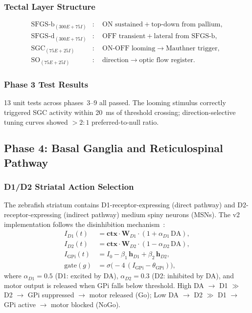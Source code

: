 \documentclass[11pt,a4paper]{article}
\begin{document}
\subsubsection{Tectal Layer Structure}

\begin{equation}\label{eq:tectal_layers}
\begin{aligned}
  \mathrm{SFGS\text{-}b}_{(300E+75I)}&: \quad \text{ON sustained} + \text{top-down from pallium}, \\
  \mathrm{SFGS\text{-}d}_{(300E+75I)}&: \quad \text{OFF transient} + \text{lateral from SFGS-b}, \\
  \mathrm{SGC}_{(75E+25I)}&:            \quad \text{ON-OFF looming} \to \text{Mauthner trigger}, \\
  \mathrm{SO}_{(75E+25I)}&:             \quad \text{direction} \to \text{optic flow register}.
\end{aligned}
\end{equation}

\subsubsection{Phase 3 Test Results}

13 unit tests across phases~3--9 all passed.
The looming stimulus correctly triggered SGC activity within 20~ms of
threshold crossing; direction-selective tuning curves showed $> 2:1$
preferred-to-null ratio.

\subsection{Phase 4: Basal Ganglia and Reticulospinal Pathway}\label{sec:phase4}

\subsubsection{D1/D2 Striatal Action Selection}

The zebrafish striatum contains D1-receptor-expressing (direct pathway)
and D2-receptor-expressing (indirect pathway) medium spiny neurons (MSNs).
The v2 implementation follows the disinhibition mechanism~\cite{wolf2009}:
\begin{equation}\label{eq:bg_d1d2}
\boxed{
\begin{aligned}
  I_{D1}(t) &= \mathbf{ctx} \cdot \mathbf{W}_{D1} \cdot (1 + \alpha_{D1}\,\mathrm{DA}), \\
  I_{D2}(t) &= \mathbf{ctx} \cdot \mathbf{W}_{D2} \cdot (1 - \alpha_{D2}\,\mathrm{DA}), \\
  I_\mathrm{GPi}(t) &= I_0 - \beta_1\,\mathbf{h}_{D1} + \beta_2\,\mathbf{h}_{D2}, \\
  \mathrm{gate}(g) &= \sigma\bigl(-4\,(I_\mathrm{GPi} - \theta_\mathrm{GPi})\bigr),
\end{aligned}
}
\end{equation}
where $\alpha_{D1} = 0.5$ (D1: excited by DA), $\alpha_{D2} = 0.3$
(D2: inhibited by DA), and motor output is released when GPi falls
below threshold.
High DA $\to$ D1 $\gg$ D2 $\to$ GPi suppressed $\to$ motor released (Go);
Low DA $\to$ D2 $\gg$ D1 $\to$ GPi active $\to$ motor blocked (NoGo).
\end{document}
